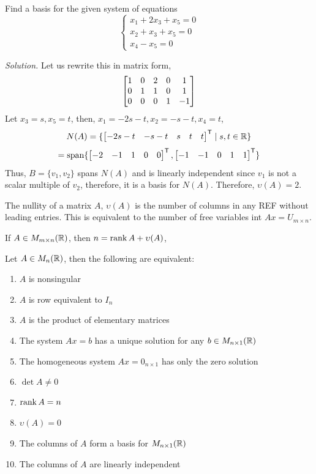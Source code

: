 \begin{example}
Find a basis for the given system of equations
$$
\begin{cases}
x_1 + 2x_3 + x_5 = 0 \\
x_2 + x_3 + x_5 = 0 \\
x_4 - x_5 = 0
\end{cases}
$$

\textit{Solution.} Let us rewrite this in matrix form,
$$\begin{bmatrix} 1 & 0 & 2 & 0 & 1 \\ 0 & 1 & 1 & 0 & 1 \\ 0 & 0 & 0 & 1 & -1 \end{bmatrix}$$
Let $x_3 = s, x_5 = t$, then, $x_1 = -2s - t, x_2 = -s - t, x_4 = t$,
$$N(A) = \{\begin{bmatrix} -2s - t & -s -t & s & t & t \end{bmatrix}^{\mathsf{T}} \mid s, t \in \mathbb{R}\}$$
$$=\operatorname{span}\{\begin{bmatrix} -2 & -1 & 1 & 0 & 0 \end{bmatrix}^{\mathsf{T}}, \begin{bmatrix} -1 & -1 & 0 & 1 & 1 \end{bmatrix}^{\mathsf{T}}\}$$
Thus, $B = \{v_1, v_2\}$ spans $N(A)$ and is linearly independent since $v_1$ is 
not a scalar multiple of $v_2$, therefore, it is a basis for $N(A)$. Therefore, 
$\upsilon(A) = 2$.
\end{example}

\begin{remark}
The nullity of a matrix $A$, $\upsilon(A)$ is the number of columns in any REF 
without leading entries. This is equivalent to the number of free variables 
int $Ax = U_{m \times n}$.
\end{remark}

\begin{theorem}
If $A \in M_{m \times n}(\mathbb{R})$, then $n = \rank A + \upsilon(A)$,
\end{theorem}

\begin{theorem}
Let $A \in M_n(\mathbb{R})$, then the following are equivalent:
\begin{enumerate}
    \item $A$ is nonsingular
    \item $A$ is row equivalent to $I_n$
    \item $A$ is the product of elementary matrices
    \item The system $Ax = b$ has a unique solution for any $b \in M_{n \times 1}(\mathbb{R})$
    \item The homogeneous system $Ax = 0_{n \times 1}$ has only the zero solution
    \item $\det A \neq 0$
    \item $\rank A = n$
    \item $\upsilon(A) = 0$
    \item The columns of $A$ form a basis for $M_{n \times 1}(\mathbb{R})$
    \item The columns of $A$ are linearly independent
\end{enumerate}
\end{theorem}